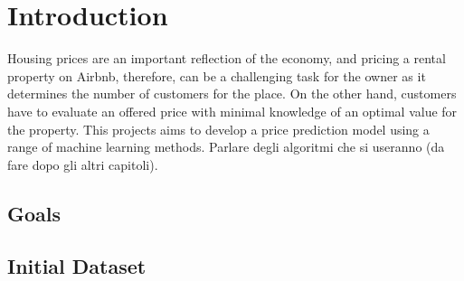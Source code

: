 \section{Introduction}
Housing prices are an important reflection of the economy, and pricing a rental property on Airbnb, therefore, can be a challenging task for the owner as it determines the number of customers for the place. On the other hand, customers have to evaluate an offered price with minimal knowledge of an optimal value for the property. This projects aims to develop a price prediction model using a range of machine learning methods.
Parlare degli algoritmi che si useranno (da fare dopo gli altri capitoli).

\subsection{Goals}

\subsection{Initial Dataset}

\medskip 

